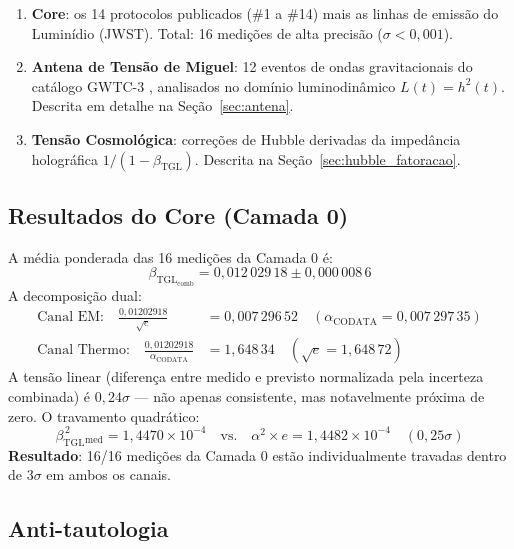 \documentclass[12pt,a4paper,twoside]{article}
\newcommand{\betatgl}{\beta_{\!\scriptscriptstyle\mathrm{TGL}}}
\begin{document}
\begin{enumerate}[label=\textbf{Camada \arabic*},nosep,leftmargin=*]
\item[\textbf{Camada 0}] \textbf{Core}: os 14 protocolos publicados (\#1 a \#14) mais as linhas de emissão do Luminídio (JWST). Total: 16 medições de alta precisão ($\sigma < 0{,}001$).

\item[\textbf{Camada 1}] \textbf{Antena de Tensão de Miguel}: 12 eventos de ondas gravitacionais do catálogo GWTC-3 \cite{GWTC3}, analisados no domínio luminodinâmico $L(t) = h^2(t)$. Descrita em detalhe na Seção~\ref{sec:antena}.

\item[\textbf{Camada 2}] \textbf{Tensão Cosmológica}: correções de Hubble derivadas da impedância holográfica $1/(1 - \betatgl)$. Descrita na Seção~\ref{sec:hubble_fatoracao}.
\end{enumerate}


\subsection{Resultados do Core (Camada 0)}
\label{subsec:core_results}

A média ponderada das 16 medições da Camada 0 é:
%
\begin{equation}
\betatgl_{\text{comb}} = 0{,}012\,029\,18 \pm 0{,}000\,008\,6
\end{equation}
%
A decomposição dual:
%
\begin{align}
\text{Canal EM:} \quad \frac{0{,}01202918}{\sqrt{e}} &= 0{,}007\,296\,52 \quad (\alpha_{\text{CODATA}} = 0{,}007\,297\,35) \\
\text{Canal Thermo:} \quad \frac{0{,}01202918}{\alpha_{\text{CODATA}}} &= 1{,}648\,34 \quad (\sqrt{e} = 1{,}648\,72)
\end{align}
%
A tensão linear (diferença entre medido e previsto normalizada pela incerteza combinada) é $0{,}24\sigma$ --- não apenas consistente, mas notavelmente próxima de zero. O travamento quadrático:
%
\begin{equation}
\betatgl^{\,2}_{\text{med}} = 1{,}4470 \times 10^{-4} \quad \text{vs.} \quad \alpha^2 \times e = 1{,}4482 \times 10^{-4} \quad (0{,}25\sigma)
\end{equation}
%
\textbf{Resultado}: 16/16 medições da Camada 0 estão individualmente travadas dentro de $3\sigma$ em ambos os canais.


\subsection{Anti-tautologia}
\label{subsec:antitautologia}
\end{document}
